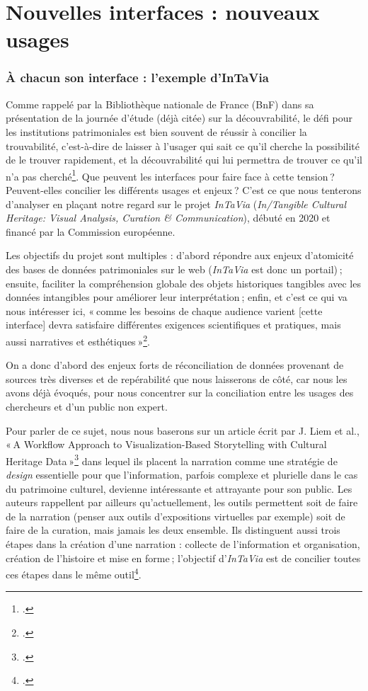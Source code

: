 \chapter{Nouvelles interfaces : nouveaux usages}

\subsection{À chacun son interface : l'exemple d'InTaVia}

Comme rappelé par la Bibliothèque nationale de France (BnF) dans sa présentation de la journée d’étude (déjà citée) sur la découvrabilité, le défi pour les institutions patrimoniales est bien souvent de réussir à concilier la trouvabilité, c’est-à-dire de laisser à l’usager qui sait ce qu’il cherche la possibilité de le trouver rapidement, et la découvrabilité qui lui permettra de trouver ce qu’il n’a pas cherché\footcite{2023e}. Que peuvent les interfaces pour faire face à cette tension ? Peuvent-elles concilier les différents usages et enjeux ? C’est ce que nous tenterons d’analyser en plaçant notre regard sur le projet \textit{InTaVia} (\textit{In/Tangible Cultural Heritage: Visual Analysis, Curation \& Communication}), débuté en 2020 et financé par la Commission européenne.

Les objectifs du projet sont multiples : d’abord répondre aux enjeux d’atomicité des bases de données patrimoniales sur le web (\textit{InTaVia} est donc un portail) ; ensuite, faciliter la compréhension globale des objets historiques tangibles avec les données intangibles pour améliorer leur interprétation ; enfin, et c’est ce qui va nous intéresser ici, « comme les besoins de chaque audience varient [cette interface] devra satisfaire différentes exigences scientifiques et pratiques, mais aussi narratives et esthétiques »\footcite{noauthor_overall_nodate}.

On a donc d’abord des enjeux forts de réconciliation de données provenant de sources très diverses et de repérabilité que nous laisserons de côté, car nous les avons déjà évoqués, pour nous concentrer sur la conciliation entre les usages des chercheurs et d’un public non expert.

Pour parler de ce sujet, nous nous baserons sur un article écrit par J. Liem et al., « A Workflow Approach to Visualization-Based Storytelling with Cultural Heritage Data »\footcite{liem_workflow_2023} dans lequel ils placent la narration comme une stratégie de \textit{design} essentielle pour que l’information, parfois complexe et plurielle dans le cas du patrimoine culturel, devienne intéressante et attrayante pour son public. Les auteurs rappellent par ailleurs qu’actuellement, les outils permettent soit de faire de la narration (penser aux outils d’expositions virtuelles par exemple) soit de faire de la curation, mais jamais les deux ensemble. Ils distinguent aussi trois étapes dans la création d’une narration : collecte de l’information et organisation, création de l’histoire et mise en forme ; l’objectif d’\textit{InTaVia} est de concilier toutes ces étapes dans le même outil\footcite[introduction]{liem_workflow_2023}.

